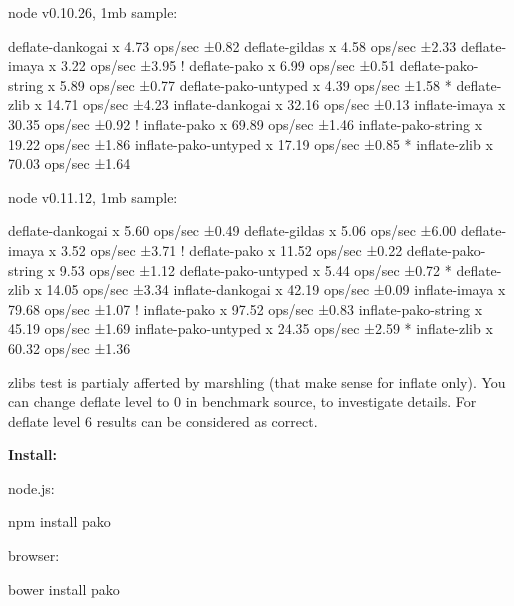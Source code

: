 \begin{DoxyCode}
node v0.10.26, 1mb sample:

   deflate-dankogai x 4.73 ops/sec ±0.82%
   deflate-gildas x 4.58 ops/sec ±2.33%
   deflate-imaya x 3.22 ops/sec ±3.95%
 ! deflate-pako x 6.99 ops/sec ±0.51%
   deflate-pako-string x 5.89 ops/sec ±0.77%
   deflate-pako-untyped x 4.39 ops/sec ±1.58%
 * deflate-zlib x 14.71 ops/sec ±4.23%
   inflate-dankogai x 32.16 ops/sec ±0.13%
   inflate-imaya x 30.35 ops/sec ±0.92%
 ! inflate-pako x 69.89 ops/sec ±1.46%
   inflate-pako-string x 19.22 ops/sec ±1.86%
   inflate-pako-untyped x 17.19 ops/sec ±0.85%
 * inflate-zlib x 70.03 ops/sec ±1.64%

node v0.11.12, 1mb sample:

   deflate-dankogai x 5.60 ops/sec ±0.49%
   deflate-gildas x 5.06 ops/sec ±6.00%
   deflate-imaya x 3.52 ops/sec ±3.71%
 ! deflate-pako x 11.52 ops/sec ±0.22%
   deflate-pako-string x 9.53 ops/sec ±1.12%
   deflate-pako-untyped x 5.44 ops/sec ±0.72%
 * deflate-zlib x 14.05 ops/sec ±3.34%
   inflate-dankogai x 42.19 ops/sec ±0.09%
   inflate-imaya x 79.68 ops/sec ±1.07%
 ! inflate-pako x 97.52 ops/sec ±0.83%
   inflate-pako-string x 45.19 ops/sec ±1.69%
   inflate-pako-untyped x 24.35 ops/sec ±2.59%
 * inflate-zlib x 60.32 ops/sec ±1.36%
\end{DoxyCode}


zlib\textquotesingle{}s test is partialy afferted by marshling (that make sense for inflate only). You can change deflate level to 0 in benchmark source, to investigate details. For deflate level 6 results can be considered as correct.

{\bfseries Install\+:}

node.\+js\+:


\begin{DoxyCode}
npm install pako
\end{DoxyCode}


browser\+:


\begin{DoxyCode}
bower install pako
\end{DoxyCode}


